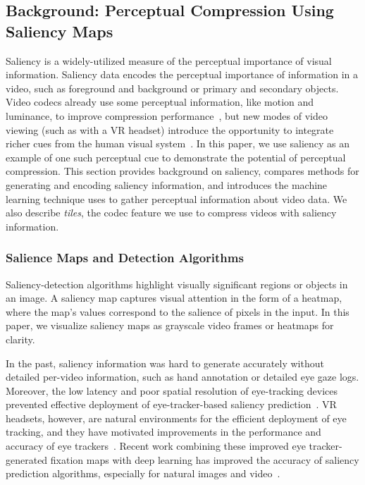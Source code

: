 
\subsection{Background: Perceptual Compression Using Saliency Maps}

\label{sec:saliency}
Saliency is a widely-utilized measure of the perceptual importance of visual information.
Saliency data encodes the perceptual importance of information in a video, such as foreground and background or primary and secondary objects.
Video codecs already use some perceptual information, like motion and luminance, to improve compression performance~\cite{hevc}, but new modes of video viewing (such as with a VR headset) introduce the opportunity to integrate richer cues from the human visual system~\cite{lee2012perceptualcodingsurvey}.
In this paper, we use saliency as an example of one such perceptual cue to demonstrate the potential of perceptual compression.
This section provides background on saliency, compares methods for generating and encoding saliency information, and introduces the machine learning technique \name uses to gather perceptual information about video data.
We also describe \emph{tiles}, the codec feature we use to compress videos with saliency information.

\subsubsection{Salience Maps and Detection Algorithms} Saliency-detection algorithms highlight visually significant regions or objects in an image.
A saliency map captures visual attention in the form of a heatmap, where the map's values correspond to the salience of pixels in the input.
In this paper, we visualize saliency maps as grayscale video frames or heatmaps for clarity.

In the past, saliency information was hard to generate accurately without detailed per-video information, such as hand annotation or detailed eye gaze logs.
Moreover, the low latency and poor spatial resolution of eye-tracking devices prevented effective deployment of eye-tracker-based saliency prediction~\cite{bulling}.
VR headsets, however, are natural environments for the efficient deployment of eye tracking, and they have motivated improvements in the performance and accuracy of eye trackers~\cite{Whitmire:2016:ESC:2971763.2971771}.
Recent work combining these improved eye tracker-generated fixation maps with deep learning has improved the accuracy of saliency prediction algorithms, especially for natural images and video~\cite{bylinskii2016saliency}.

